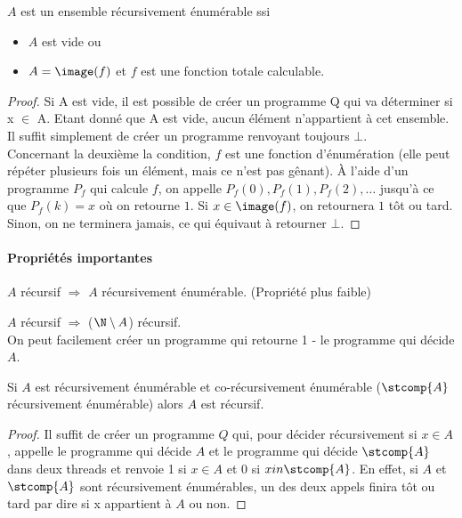 \begin{myprop}
	$A$ est un ensemble récursivement énumérable ssi
    \begin{itemize}
      \item $A$ est vide ou
      \item $A = \image(f)$ et $f$ est une fonction totale calculable.
    \end{itemize}

    \begin{proof}
      Si A est vide, il est possible de créer un programme Q qui va déterminer si x $\in$ A. Etant donné que A est vide, aucun élément n'appartient à cet ensemble. Il suffit simplement de créer un programme renvoyant toujours $\bot$. \\
      Concernant la deuxième la condition, $f$ est une fonction d'énumération (elle peut répéter plusieurs fois un élément, mais ce n'est pas gênant).
      À l'aide d'un programme $P_f$ qui calcule $f$,
      on appelle $P_f(0), P_f(1), P_f(2), \ldots$
      jusqu'à ce que $P_f(k) = x$ où on retourne $1$.
      Si $x \in \image(f)$, on retournera $1$ tôt ou tard.
      Sinon, on ne terminera jamais, ce qui équivaut à retourner $\bot$.
    \end{proof}
\end{myprop}


\paragraph{Propriétés importantes}
\label{par:propri_t_s_importantes}
\begin{myprop}
	$A$ récursif $\Rightarrow$ $A$ récursivement énumérable. (Propriété plus
		faible)
\end{myprop}

\begin{myprop}
	$A$ récursif $\Rightarrow$ ($\N \setminus A$) récursif.\\ On peut facilement créer
		un programme qui retourne 1 - le programme qui décide $A$.
\end{myprop}

\begin{myprop}
    Si $A$ est récursivement énumérable et co-récursivement énumérable ($\stcomp{A}$ récursivement énumérable)
    alors $A$ est récursif.
    \begin{proof}
      Il suffit de créer un programme $Q$ qui, pour décider récursivement si $x \in A$, appelle le programme qui décide $A$ et le programme qui décide $\stcomp{A}$ dans deux threads et renvoie 1 si $x \in A$ et 0 si $x in \stcomp{A}$. En effet, si $A$ et $\stcomp{A}$ sont récursivement énumérables, un des deux appels finira tôt ou tard par dire si x appartient à $A$ ou non.
    \end{proof}
\end{myprop}

